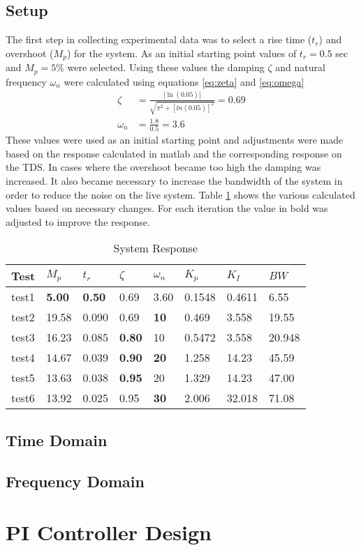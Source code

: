 \documentclass[11pt,titlepage]{article}
\begin{document}
    \subsection{Setup}
    The first step in collecting experimental data was to select a rise time ($t_r$) and overshoot ($M_p$) for the system. As an initial starting point values of $t_r = 0.5$ sec and $M_p = 5\%$ were selected. Using these values the damping $\zeta$ and natural frequency $\omega_n$ were calculated using equations \ref{eq:zeta} and \ref{eq:omega}
    \begin{align}
        \zeta &= \frac{|\ln(0.05)|}{\sqrt{\pi^2+[ln(0.05)]^2}} = 0.69 \label{eq:zeta} \\[1em]
        \omega_n &= \frac{1.8}{0.5} = 3.6 \label{eq:omega}
    \end{align}
    These values were used as an initial starting point and adjustments were made based on the response calculated in matlab and the corresponding response on the TDS. In cases where the overshoot became too high the damping was increased. It also became necessary to increase the bandwidth of the system in order to reduce the noise on the live system. Table \ref{table:respData} shows the various calculated values based on necessary changes. For each iteration the value in bold was adjusted to improve the response.
    \begin{table}[H]
        \centering
        \begin{tabular}{|m{1.5cm}|m{1.5cm}|m{1.5cm}|m{1.5cm}|m{1.5cm}|m{1.5cm}|m{1.5cm}|m{1.5cm}|} 
            \hline
            Test & $M_p$ & $t_r$ & $\zeta$ & $\omega_n$ & $K_p$ & $K_I$ & $BW$ \\ 
            \hline
            test1 & \textbf{5.00} & \textbf{0.50} & 0.69 & 3.60 & 0.1548 & 0.4611 & 6.55 \\
            \hline
            test2 & 19.58 & 0.090 & 0.69 & \textbf{10} & 0.469 & 3.558 & 19.55 \\
            \hline
            test3 & 16.23 & 0.085 & \textbf{0.80} & 10 & 0.5472 & 3.558 & 20.948 \\
            \hline
            test4 & 14.67 & 0.039 & \textbf{0.90} & \textbf{20} & 1.258 & 14.23 & 45.59 \\
            \hline
            test5 & 13.63 & 0.038 & \textbf{0.95} & 20 & 1.329 & 14.23 & 47.00 \\
            \hline
            test6 & 13.92 & 0.025 & 0.95 & \textbf{30} & 2.006 & 32.018 & 71.08 \\
            \hline
        \end{tabular}
        \caption{System Response} \label{table:respData}
    \end{table}
    \subsection{Time Domain}

    \subsection{Frequency Domain}

\section{PI Controller Design}
\end{document}
